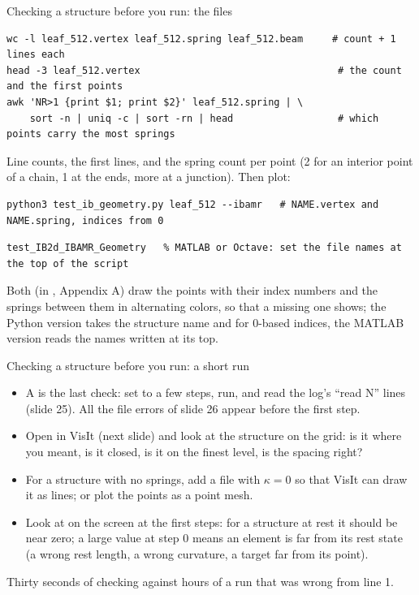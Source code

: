 \documentclass[aspectratio=169,11pt]{beamer}
\begin{document}
\begin{frame}[fragile]{Checking a structure before you run: the files}
\begin{lstlisting}[style=shell]
wc -l leaf_512.vertex leaf_512.spring leaf_512.beam     # count + 1 lines each
head -3 leaf_512.vertex                                  # the count and the first points
awk 'NR>1 {print $1; print $2}' leaf_512.spring | \
    sort -n | uniq -c | sort -rn | head                  # which points carry the most springs
\end{lstlisting}
\small Line counts, the first lines, and the spring count per point (2 for an interior point of a chain, 1 at the ends, more at a junction). Then plot:
\begin{lstlisting}[style=shell]
python3 test_ib_geometry.py leaf_512 --ibamr   # NAME.vertex and NAME.spring, indices from 0
\end{lstlisting}
\begin{lstlisting}[style=matlab]
test_IB2d_IBAMR_Geometry   % MATLAB or Octave: set the file names at the top of the script
\end{lstlisting}
\small Both (in , Appendix A) draw the points with their index numbers and the springs between them in alternating colors, so that a missing one shows; the Python version takes the structure name and  for 0-based indices, the MATLAB version reads the names written at its top.
\end{frame}

\begin{frame}{Checking a structure before you run: a short run}
\begin{itemize}
  \item A  is the last check: set  to a few steps, run, and read the log's ``read N'' lines (slide 25). All the file errors of slide 26 appear before the first step.
  \item Open \code{lag\_data.visit} in VisIt (next slide) and look at the structure on the grid: is it where you meant, is it closed, is it on the finest level, is the spacing right?
  \item For a structure with no springs, add a \code{.spring} file with $\kappa = 0$ so that VisIt can draw it as lines; or plot the points as a point mesh.
  \item Look at \code{integral\{F\}} on the screen at the first steps: for a structure at rest it should be near zero; a large value at step 0 means an element is far from its rest state (a wrong rest length, a wrong curvature, a target far from its point).
\end{itemize}
\vspace{2mm}
\begin{punchbox}
\small Thirty seconds of checking against hours of a run that was wrong from line 1.
\end{punchbox}
\end{frame}
\end{document}
